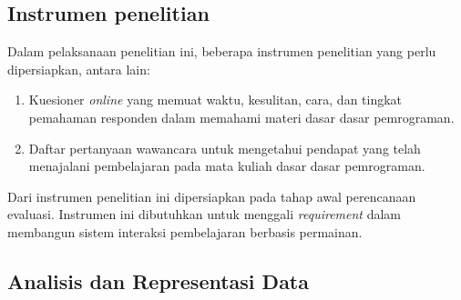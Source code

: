 	\subsection{Instrumen penelitian}
	
	Dalam pelaksanaan penelitian ini, beberapa instrumen penelitian yang perlu dipersiapkan, antara lain:
	
	\begin{enumerate}
		\item Kuesioner \textit{online} yang memuat waktu, kesulitan, cara, dan tingkat pemahaman responden dalam memahami materi dasar dasar pemrograman.
		\item Daftar pertanyaan wawancara untuk mengetahui pendapat yang telah menajalani pembelajaran pada mata kuliah dasar dasar pemrograman.
	\end{enumerate}

	Dari instrumen penelitian ini dipersiapkan pada tahap awal perencanaan evaluasi. Instrumen ini dibutuhkan untuk menggali \textit{requirement} dalam membangun sistem interaksi pembelajaran berbasis permainan.
	
	\subsection{Analisis dan Representasi Data}
	
